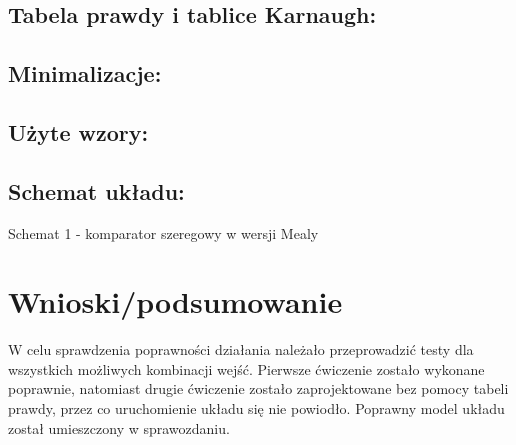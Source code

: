 \documentclass[12pt,a4paper]{article}
\begin{document}
		\subsection{Tabela prawdy i tablice Karnaugh:}
		
		
		\subsection{Minimalizacje:}
		
		
		\subsection{Użyte wzory:}
		
		
		\subsection{Schemat układu:}
		
		\vspace{1.5cm}
		\begin{center}
			Schemat 1 - komparator szeregowy w wersji Mealy
		\end{center}

	\section{Wnioski/podsumowanie}
	
			W celu sprawdzenia poprawności działania należało przeprowadzić testy dla wszystkich możliwych kombinacji wejść. Pierwsze ćwiczenie zostało wykonane poprawnie, natomiast drugie ćwiczenie zostało zaprojektowane bez pomocy tabeli prawdy, przez co uruchomienie układu się nie powiodło. Poprawny model układu został umieszczony w sprawozdaniu.
	
\end{document}
